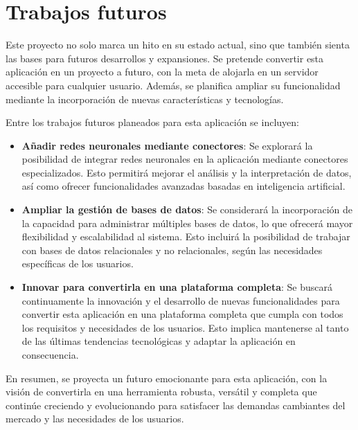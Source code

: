 \documentclass[a4paper, 12pt]{book}
\begin{document}
\section{Trabajos futuros}
\label{sec:trabajos_futuros}

Este proyecto no solo marca un hito en su estado actual, sino que también sienta las bases para futuros desarrollos y expansiones. 
Se pretende convertir esta aplicación en un proyecto a futuro, con la meta de alojarla en un servidor accesible para cualquier usuario. 
Además, se planifica ampliar su funcionalidad mediante la incorporación de nuevas características y tecnologías.

Entre los trabajos futuros planeados para esta aplicación se incluyen:

\begin{itemize}
  \item \textbf{Añadir redes neuronales mediante conectores}: Se explorará la posibilidad de integrar redes neuronales en la aplicación 
  mediante conectores especializados. Esto permitirá mejorar el análisis y la interpretación de datos, así como ofrecer funcionalidades 
  avanzadas basadas en inteligencia artificial.
  \item \textbf{Ampliar la gestión de bases de datos}: Se considerará la incorporación de la capacidad para administrar múltiples bases 
  de datos, lo que ofrecerá mayor flexibilidad y escalabilidad al sistema. Esto incluirá la posibilidad de trabajar con bases de datos 
  relacionales y no relacionales, según las necesidades específicas de los usuarios.
  \item \textbf{Innovar para convertirla en una plataforma completa}: Se buscará continuamente la innovación y el desarrollo de nuevas 
  funcionalidades para convertir esta aplicación en una plataforma completa que cumpla con todos los requisitos y necesidades de los 
  usuarios. Esto implica mantenerse al tanto de las últimas tendencias tecnológicas y adaptar la aplicación en consecuencia.
\end{itemize}

En resumen, se proyecta un futuro emocionante para esta aplicación, con la visión de convertirla en una herramienta robusta, versátil y completa que continúe creciendo y evolucionando para satisfacer las demandas cambiantes del mercado y las necesidades de los usuarios.



\end{document}
